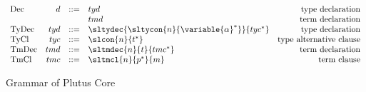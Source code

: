 \documentclass[../plutus-core-specification.tex]{subfiles}
\begin{document}
\begin{figure}[H]
\[\begin{array}{lrclr}
        \textrm{Dec}   & d   & ::= & tyd                          & \textrm{type declaration}\\
                       &     &     & tmd                          & \textrm{term declaration}\\
        \textrm{TyDec} & tyd & ::= & \sltydec{
                                        \sltycon{n}
                                         {\variable{\alpha}^*}
                                     }{tyc^*}                     & \textrm{type declaration}\\
        \textrm{TyCl}  & tyc & ::= & \slcon{n}{t^*}               & \textrm{type alternative clause}\\
        \textrm{TmDec} & tmd & ::= & \sltmdec{n}{t}{tmc^*}       & \textrm{term declaration}\\
        \textrm{TmCl}  & tmc & ::= & \sltmcl{n}{p^*}{m}           & \textrm{term clause}\\
    \end{array}\]
    \caption{Grammar of Plutus Core}
    \label{fig:Plutus_grammar}
\end{figure}
\end{document}

